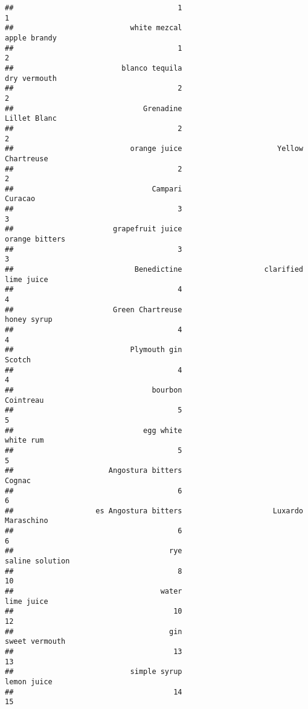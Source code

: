 \documentclass[
]{article}
\begin{document}
\begin{verbatim}
##                                      1                                      1 
##                           white mezcal                           apple brandy 
##                                      1                                      2 
##                         blanco tequila                           dry vermouth 
##                                      2                                      2 
##                              Grenadine                           Lillet Blanc 
##                                      2                                      2 
##                           orange juice                      Yellow Chartreuse 
##                                      2                                      2 
##                                Campari                                Curacao 
##                                      3                                      3 
##                       grapefruit juice                         orange bitters 
##                                      3                                      3 
##                            Benedictine                   clarified lime juice 
##                                      4                                      4 
##                       Green Chartreuse                            honey syrup 
##                                      4                                      4 
##                           Plymouth gin                                 Scotch 
##                                      4                                      4 
##                                bourbon                              Cointreau 
##                                      5                                      5 
##                              egg white                              white rum 
##                                      5                                      5 
##                      Angostura bitters                                 Cognac 
##                                      6                                      6 
##                   es Angostura bitters                     Luxardo Maraschino 
##                                      6                                      6 
##                                    rye                        saline solution 
##                                      8                                     10 
##                                  water                             lime juice 
##                                     10                                     12 
##                                    gin                         sweet vermouth 
##                                     13                                     13 
##                           simple syrup                            lemon juice 
##                                     14                                     15
\end{verbatim}
\end{document}
